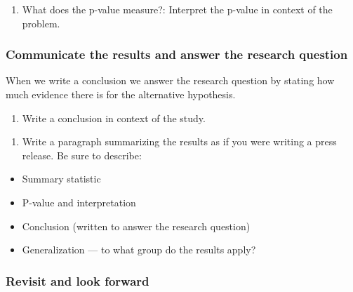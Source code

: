 \documentclass[
]{report}
\providecommand{\tightlist}{%
  \setlength{\itemsep}{0pt}\setlength{\parskip}{0pt}}
\begin{document}
\begin{enumerate}
\def\labelenumi{\arabic{enumi}.}
\setcounter{enumi}{24}
\tightlist
\item
  What does the p-value measure?: Interpret the p-value in context of the problem.
\end{enumerate}

\vspace{1in}

\hypertarget{communicate-the-results-and-answer-the-research-question}{%
\subsubsection*{Communicate the results and answer the research question}\label{communicate-the-results-and-answer-the-research-question}}

When we write a conclusion we answer the research question by stating how much evidence there is for the alternative hypothesis.

\begin{enumerate}
\def\labelenumi{\arabic{enumi}.}
\setcounter{enumi}{25}
\tightlist
\item
  Write a conclusion in context of the study.
\end{enumerate}

\vspace{1in}

\begin{enumerate}
\def\labelenumi{\arabic{enumi}.}
\setcounter{enumi}{26}
\tightlist
\item
  Write a paragraph summarizing the results as if you were writing a press release. Be sure to describe:
\end{enumerate}

\begin{itemize}
\item
  Summary statistic
\item
  P-value and interpretation
\item
  Conclusion (written to answer the research question)
\item
  Generalization --- to what group do the results apply?
\end{itemize}

\vspace{4in}

\hypertarget{revisit-and-look-forward}{%
\subsubsection*{Revisit and look forward}\label{revisit-and-look-forward}}
\end{document}
